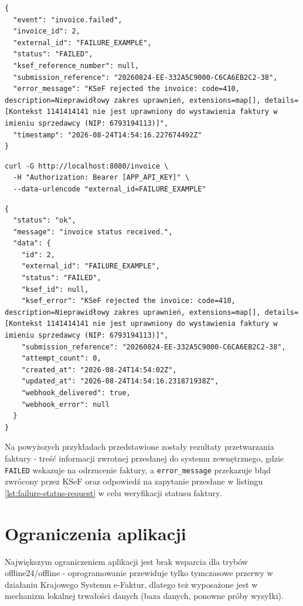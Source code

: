 \begin{lstlisting}[style=thesiscode, caption={Webhook informujący o odrzuceniu faktury}, label={lst:failure-webhook}]
{
  "event": "invoice.failed",
  "invoice_id": 2,
  "external_id": "FAILURE_EXAMPLE",
  "status": "FAILED",
  "ksef_reference_number": null,
  "submission_reference": "20260824-EE-332A5C9000-C6CA6EB2C2-38",
  "error_message": "KSeF rejected the invoice: code=410, description=Nieprawidłowy zakres uprawnień, extensions=map[], details=[Kontekst 1141414141 nie jest uprawniony do wystawienia faktury w imieniu sprzedawcy (NIP: 6793194113)]",
  "timestamp": "2026-08-24T14:54:16.227674492Z"
}
\end{lstlisting}

\begin{lstlisting}[style=thesiscode, caption={Zapytanie o końcowy status odrzuconej faktury}, label={lst:failure-status-request}]
curl -G http://localhost:8080/invoice \
  -H "Authorization: Bearer [APP_API_KEY]" \
  --data-urlencode "external_id=FAILURE_EXAMPLE"
\end{lstlisting}

\begin{lstlisting}[style=thesiscode, caption={Końcowy status odrzuconej faktury}, label={lst:failure-status-response}]
{
  "status": "ok",
  "message": "invoice status received.",
  "data": {
    "id": 2,
    "external_id": "FAILURE_EXAMPLE",
    "status": "FAILED",
    "ksef_id": null,
    "ksef_error": "KSeF rejected the invoice: code=410, description=Nieprawidłowy zakres uprawnień, extensions=map[], details=[Kontekst 1141414141 nie jest uprawniony do wystawienia faktury w imieniu sprzedawcy (NIP: 6793194113)]",
    "submission_reference": "20260824-EE-332A5C9000-C6CA6EB2C2-38",
    "attempt_count": 0,
    "created_at": "2026-08-24T14:54:02Z",
    "updated_at": "2026-08-24T14:54:16.231871938Z",
    "webhook_delivered": true,
    "webhook_error": null
  }
}
\end{lstlisting}

Na powyższych przykładach przedstawione zostały rezultaty przetwarzania faktury - treść informacji zwrotnej przesłanej do systemu zewnętrznego, gdzie \texttt{FAILED} wskazuje na odrzucenie faktury, a \texttt{error\_message} przekazuje błąd zwrócony przez KSeF oraz odpowiedź na zapytanie przesłane w listingu \ref{lst:failure-status-request} w celu weryfikacji statusu faktury.

\section{Ograniczenia aplikacji}
Największym ograniczeniem aplikacji jest brak wsparcia dla trybów offline24/offline \parencite{mf_offline24_2025,mf_offline_2025} - oprogramowanie przewiduje tylko tymczasowe przerwy w działaniu Krajowego Systemu e-Faktur, dlatego też wyposażone jest w mechanizm lokalnej trwałości danych (baza danych, ponowne próby wysyłki). 

